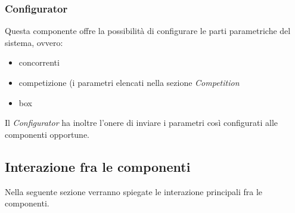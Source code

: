 \subsubsection{Configurator}
Questa componente offre la possibilit\`{a} di configurare le parti parametriche del sistema, ovvero:
\begin{itemize}
	\item concorrenti 
	\item competizione (i parametri elencati nella sezione \emph{Competition}
	\item box
\end{itemize}
Il \emph{Configurator} ha inoltre l'onere di inviare i parametri cos\`{i} configurati alle componenti opportune.

\subsection{Interazione fra le componenti}
Nella seguente sezione verranno spiegate le interazione principali fra le componenti.\\\\

